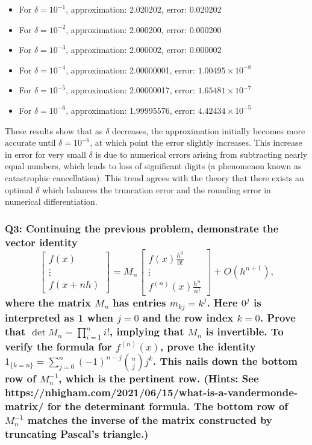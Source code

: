 \documentclass[8pt]{article}
\begin{document}
\begin{itemize}
    \item For \( \delta = 10^{-1} \), approximation: 2.020202, error: 0.020202
    \item For \( \delta = 10^{-2} \), approximation: 2.000200, error: 0.000200
    \item For \( \delta = 10^{-3} \), approximation: 2.000002, error: 0.000002
    \item For \( \delta = 10^{-4} \), approximation: 2.00000001, error: \( 1.00495 \times 10^{-8} \)
    \item For \( \delta = 10^{-5} \), approximation: 2.00000017, error: \( 1.65481 \times 10^{-7} \)
    \item For \( \delta = 10^{-6} \), approximation: 1.99995576, error: \( 4.42434 \times 10^{-5} \)
\end{itemize}

These results show that as \( \delta \) decreases, the approximation initially becomes more accurate until \( \delta = 10^{-6} \), at which point the error slightly increases. This increase in error for very small \( \delta \) is due to numerical errors arising from subtracting nearly equal numbers, which leads to loss of significant digits (a phenomenon known as catastrophic cancellation). This trend agrees with the theory that there exists an optimal \( \delta \) which balances the truncation error and the rounding error in numerical differentiation.

\subsubsection*{Q3: Continuing the previous problem, demonstrate the vector identity
\[
\begin{bmatrix}
f(x) \\
\vdots \\
f(x + nh)
\end{bmatrix}
=
M_n
\begin{bmatrix}
f(x) \frac{h^0}{0!} \\
\vdots \\
f^{(n)}(x) \frac{h^n}{n!}
\end{bmatrix}
+ O(h^{n+1}),
\]
where the matrix \( M_n \) has entries \( m_{kj} = k^j \). Here \( 0^j \) is interpreted as 1 when \( j = 0 \) and the row index \( k = 0 \). Prove that \( \det M_n = \prod_{i=1}^n i! \), implying that \( M_n \) is invertible. To verify the formula for \( f^{(n)}(x) \), prove the identity \( 1_{\{k=n\}} = \sum_{j=0}^n (-1)^{n-j} \binom{n}{j} j^k \). This nails down the bottom row of \( M_n^{-1} \), which is the pertinent row. (Hints: See https://nhigham.com/2021/06/15/what-is-a-vandermonde-matrix/ for the determinant formula. The bottom row of \( M_n^{-1} \) matches the inverse of the matrix constructed by truncating Pascal’s triangle.)}
\end{document}
